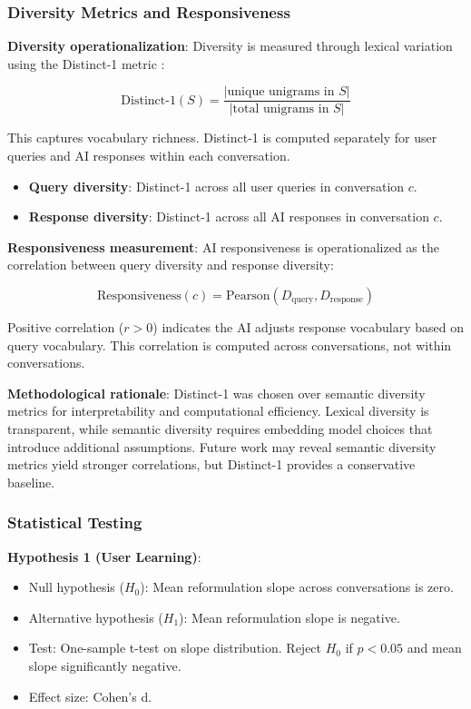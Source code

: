 \subsubsection{Diversity Metrics and Responsiveness}

\textbf{Diversity operationalization}: Diversity is measured through lexical variation using the Distinct-1 metric \citep{li2016diversity}:

$$\text{Distinct-1}(S) = \frac{|\text{unique unigrams in } S|}{|\text{total unigrams in } S|}$$

This captures vocabulary richness. Distinct-1 is computed separately for user queries and AI responses within each conversation.

\begin{itemize}
\item \textbf{Query diversity}: Distinct-1 across all user queries in conversation $c$.
\item \textbf{Response diversity}: Distinct-1 across all AI responses in conversation $c$.
\end{itemize}

\textbf{Responsiveness measurement}: AI responsiveness is operationalized as the correlation between query diversity and response diversity:

$$\text{Responsiveness}(c) = \text{Pearson}(D_{\text{query}}, D_{\text{response}})$$

Positive correlation ($r > 0$) indicates the AI adjusts response vocabulary based on query vocabulary. This correlation is computed across conversations, not within conversations.

\textbf{Methodological rationale}: Distinct-1 was chosen over semantic diversity metrics for interpretability and computational efficiency. Lexical diversity is transparent, while semantic diversity requires embedding model choices that introduce additional assumptions. Future work may reveal semantic diversity metrics yield stronger correlations, but Distinct-1 provides a conservative baseline.

\subsubsection{Statistical Testing}

\textbf{Hypothesis 1 (User Learning)}:
\begin{itemize}
\item Null hypothesis ($H_0$): Mean reformulation slope across conversations is zero.
\item Alternative hypothesis ($H_1$): Mean reformulation slope is negative.
\item Test: One-sample t-test on slope distribution. Reject $H_0$ if $p < 0.05$ and mean slope significantly negative.
\item Effect size: Cohen's d.
\end{itemize}

